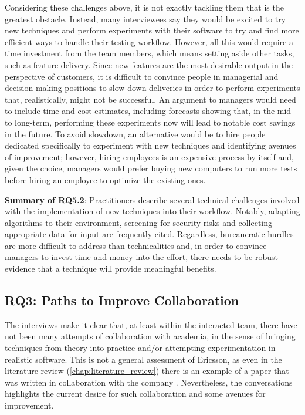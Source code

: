 Considering these challenges above, it is not exactly tackling them that is the greatest obstacle.
Instead, many interviewees say they would be excited to try new techniques and perform experiments with their software to try and find more efficient ways to handle their testing workflow.
However, all this would require a time investment from the team members, which means setting aside other tasks, such as feature delivery.
Since new features are the most desirable output in the perspective of customers, it is difficult to convince people in managerial and decision-making positions to slow down deliveries in order to perform experiments that, realistically, might not be successful.
An argument to managers would need to include time and cost estimates, including forecasts showing that, in the mid- to long-term, performing these experiments now will lead to notable cost savings in the future.
To avoid slowdown, an alternative would be to hire people dedicated specifically to experiment with new techniques and identifying avenues of improvement; however, hiring employees is an expensive process by itself and, given the choice, managers would prefer buying new computers to run more tests before hiring an employee to optimize the existing ones.

\begin{tcolorbox}%
\textbf{Summary of RQ5.2}: 
Practitioners describe several technical challenges involved with the implementation of new techniques into their workflow.
Notably, adapting algorithms to their environment, screening for security risks and collecting appropriate data for input are frequently cited.
Regardless, bureaucratic hurdles are more difficult to address than technicalities and, in order to convince managers to invest time and money into the effort, there needs to be robust evidence that a technique will provide meaningful benefits.
\end{tcolorbox}


\subsection{RQ3: Paths to Improve Collaboration}

The interviews make it clear that, at least within the interacted team, there have not been many attempts of collaboration with academia, in the sense of bringing techniques from theory into practice and/or attempting experimentation in realistic software.
This is not a general assessment of Ericsson, as even in the literature review (\autoref{chap:literature_review}) there is an example of a paper that was written in collaboration with the company \cite{najafi_improving_2019}.
Nevertheless, the conversations highlights the current desire for such collaboration and some avenues for improvement.


